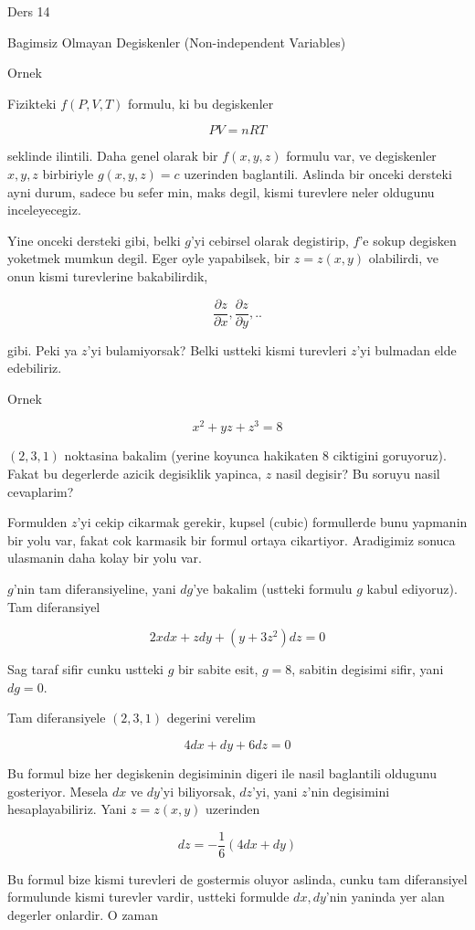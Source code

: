 \documentclass[12pt,fleqn]{article}\usepackage{../common}
\begin{document}
Ders 14

Bagimsiz Olmayan Degiskenler (Non-independent Variables)

Ornek

Fizikteki $f(P,V,T)$ formulu, ki bu degiskenler 

\[ PV = nRT \]

seklinde ilintili. Daha genel olarak bir $f(x,y,z)$ formulu var, ve
degiskenler $x,y,z$ birbiriyle $g(x,y,z) = c$ uzerinden baglantili. Aslinda
bir onceki dersteki ayni durum, sadece bu sefer min, maks degil, kismi
turevlere neler oldugunu inceleyecegiz. 

Yine onceki dersteki gibi, belki $g$'yi cebirsel olarak degistirip, $f$'e
sokup degisken yoketmek mumkun degil. Eger oyle yapabilsek, bir $z =
z(x,y)$ 
olabilirdi, ve onun kismi turevlerine bakabilirdik,

\[ \frac{\partial z}{\partial x}, \frac{\partial z}{\partial y}, .. \]

gibi. Peki ya $z$'yi bulamiyorsak? Belki ustteki kismi turevleri $z$'yi
bulmadan elde edebiliriz. 

Ornek

\[ x^2 + yz + z^3 = 8 \]

$(2,3,1)$ noktasina bakalim (yerine koyunca hakikaten 8 ciktigini
goruyoruz). Fakat bu degerlerde azicik degisiklik yapinca, $z$ nasil
degisir? Bu soruyu nasil cevaplarim? 

Formulden $z$'yi cekip cikarmak gerekir, kupsel (cubic) formullerde bunu
yapmanin bir yolu var, fakat cok karmasik bir formul ortaya
cikartiyor. Aradigimiz sonuca ulasmanin daha kolay bir yolu var. 

$g$'nin tam diferansiyeline, yani $dg$'ye bakalim (ustteki formulu $g$
kabul ediyoruz). Tam diferansiyel

\[ 2x dx + z dy + (y+3z^2) dz = 0\]

Sag taraf sifir cunku ustteki $g$ bir sabite esit, $g=8$, sabitin degisimi
sifir, yani $dg=0$. 

Tam diferansiyele $(2,3,1)$ degerini verelim

\[ 4dx + dy + 6dz = 0 \]

Bu formul bize her degiskenin degisiminin digeri ile nasil baglantili
oldugunu gosteriyor. Mesela $dx$ ve $dy$'yi biliyorsak, $dz$'yi, yani
$z$'nin degisimini hesaplayabiliriz. Yani $z=z(x,y)$ uzerinden 

\[ dz = -\frac{1}{6}(4dx + dy) \]

Bu formul bize kismi turevleri de gostermis oluyor aslinda, cunku tam
diferansiyel formulunde kismi turevler vardir, ustteki formulde $dx,dy$'nin
yaninda yer alan degerler onlardir. O zaman
\end{document}
